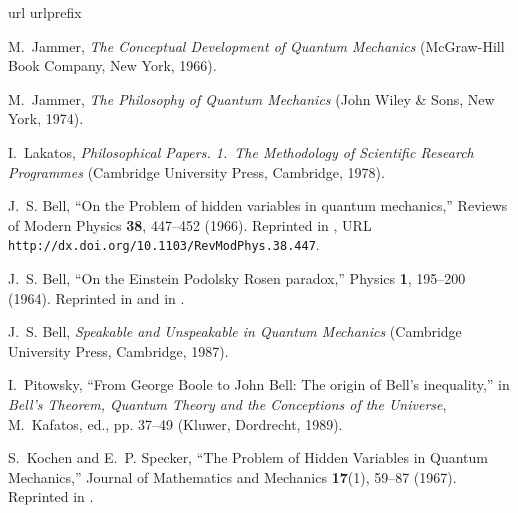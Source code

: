 \documentclass[pra,amsfonts,preprint,showkeys]{revtex4}
\begin{document}


%
%
%
%
%
%


\begin{thebibliography}{10}
\newcommand{\enquote}[1]{``#1''}
\expandafter\ifx\csname url\endcsname\relax
  \def\url#1{\texttt{#1}}\fi
\expandafter\ifx\csname urlprefix\endcsname\relax\def\urlprefix{URL }\fi
\providecommand{\eprint}[2][]{\url{#2}}

M.~Jammer, \emph{The Conceptual Development of Quantum Mechanics} (McGraw-Hill
  Book Company, New York, 1966).

M.~Jammer, \emph{The Philosophy of Quantum Mechanics} (John Wiley \& Sons, New
  York, 1974).

I.~Lakatos, \emph{Philosophical Papers. 1.~The Methodology of Scientific
  Research Programmes} (Cambridge University Press, Cambridge, 1978).

J.~S. Bell, \enquote{On the Problem of hidden variables in quantum mechanics,}
  Reviews of Modern Physics \textbf{38}, 447--452 (1966). Reprinted in
  \cite[pp. 1-13]{bell-87},
  \urlprefix\url{http://dx.doi.org/10.1103/RevModPhys.38.447}.

J.~S. Bell, \enquote{On the {E}instein {P}odolsky {R}osen paradox,} Physics
  \textbf{1}, 195--200 (1964). Reprinted in \cite[pp.
  403-408]{wheeler-Zurek:83} and in \cite[pp. 14-21]{bell-87}.

J.~S. Bell, \emph{Speakable and Unspeakable in Quantum Mechanics} (Cambridge
  University Press, Cambridge, 1987).

I.~Pitowsky, \enquote{From {G}eorge {B}oole to {J}ohn {B}ell: The origin of
  {B}ell's inequality,} in \emph{{B}ell's Theorem, Quantum Theory and the
  Conceptions of the Universe}, M.~Kafatos, ed., pp. 37--49 (Kluwer, Dordrecht,
  1989).

S.~Kochen and E.~P. Specker, \enquote{The Problem of Hidden Variables in
  Quantum Mechanics,} Journal of Mathematics and Mechanics \textbf{17}(1),
  59--87 (1967). Reprinted in \cite[pp. 235--263]{specker-ges}.


\end{thebibliography}
\end{document}
